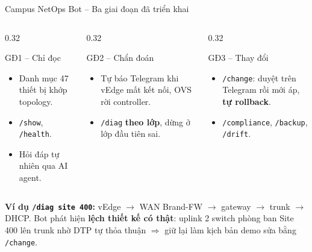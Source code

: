 \documentclass[aspectratio=169, 10pt, xcolor={table}]{beamer}
\begin{document}
\begin{frame}{Campus NetOps Bot -- Ba giai đoạn đã triển khai}
    \begin{columns}[T]
        \begin{column}{0.32\textwidth}
            \begin{card}{GĐ1 -- Chỉ đọc}
                \begin{itemize}\setlength{\itemsep}{2pt}
                    \item Danh mục 47 thiết bị khớp topology.
                    \item \texttt{/show}, \texttt{/health}.
                    \item Hỏi đáp tự nhiên qua AI agent.
                \end{itemize}
            \end{card}
        \end{column}
        \begin{column}{0.32\textwidth}
            \begin{card}[accent]{GĐ2 -- Chẩn đoán}
                \begin{itemize}\setlength{\itemsep}{2pt}
                    \item Tự báo Telegram khi vEdge mất kết nối, OVS rời controller.
                    \item \texttt{/diag} \textbf{theo lớp}, dừng ở lớp đầu tiên sai.
                \end{itemize}
            \end{card}
        \end{column}
        \begin{column}{0.32\textwidth}
            \begin{card}[okGreen]{GĐ3 -- Thay đổi}
                \begin{itemize}\setlength{\itemsep}{2pt}
                    \item \texttt{/change}: duyệt trên Telegram rồi mới áp, \textbf{tự rollback}.
                    \item \texttt{/compliance}, \texttt{/backup}, \texttt{/drift}.
                \end{itemize}
            \end{card}
        \end{column}
    \end{columns}
    \vspace{0.1cm}

    \begin{softcard}
        \textbf{\color{brand}Ví dụ \texttt{/diag site 400}:}
        vEdge $\rightarrow$ WAN Brand-FW $\rightarrow$ gateway $\rightarrow$ trunk $\rightarrow$ DHCP.
        Bot phát hiện \textbf{lệch thiết kế có thật}: uplink 2 switch phòng ban Site 400 lên trunk nhờ DTP tự thỏa thuận
        $\Rightarrow$ giữ lại làm kịch bản demo sửa bằng \texttt{/change}.
    \end{softcard}
\end{frame}
\end{document}
